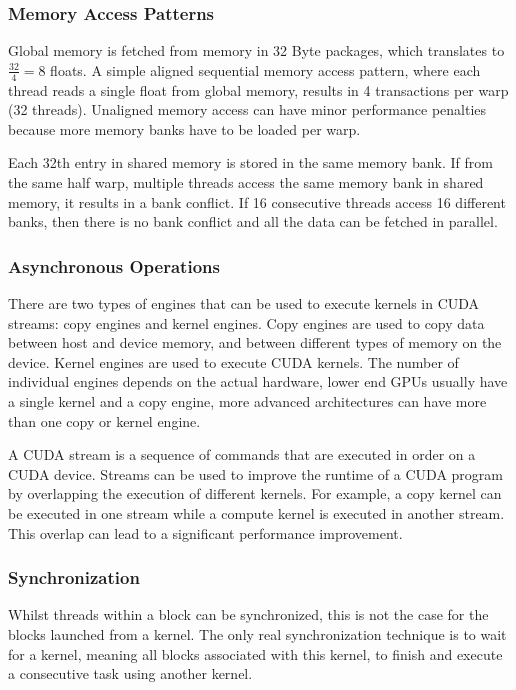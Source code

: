 \documentclass[]{article}
\begin{document}
\subsubsection{Memory Access Patterns}

Global memory is fetched from memory in 32 Byte packages, which translates to $\frac{32}{4} = 8$ floats. A simple aligned sequential memory access pattern, where each thread reads a single float from global memory, results in 4 transactions per warp (32 threads). Unaligned memory access can have minor performance penalties because more memory banks have to be loaded per warp. \cite{gMem}

Each 32th entry in shared memory is stored in the same memory bank. If from the same half warp, multiple threads access the same memory bank in shared memory, it results in a bank conflict. If 16 consecutive threads access 16 different banks, then there is no bank conflict and all the data can be fetched in parallel.


\subsubsection{Asynchronous Operations} \label{sec:async}

There are two types of engines that can be used to execute kernels in CUDA streams: copy engines and kernel engines. Copy engines are used to copy data between host and device memory, and between different types of memory on the device. Kernel engines are used to execute CUDA kernels. The number of individual engines depends on the actual hardware, lower end GPUs usually have a single kernel and a copy engine, more advanced architectures can have more than one copy or kernel engine.

A CUDA stream is a sequence of commands that are executed in order on a CUDA device. Streams can be used to improve the runtime of a CUDA program by overlapping the execution of different kernels. For example, a copy kernel can be executed in one stream while a compute kernel is executed in another stream. This overlap can lead to a significant performance improvement.


\subsubsection{Synchronization}

Whilst threads within a block can be synchronized, this is not the case for the blocks launched from a kernel. The only real synchronization technique is to wait for a kernel, meaning all blocks associated with this kernel, to finish and execute a consecutive task using another kernel. 
\end{document}
